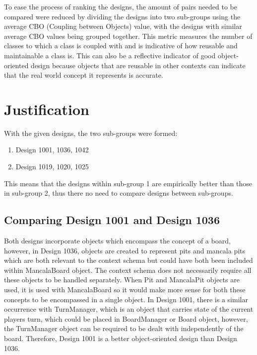 \documentclass[conference]{IEEEtran}
\begin{document}
To ease the process of ranking the designs, the amount of pairs needed to be compared were reduced by dividing the designs into two sub-groups using the average CBO (Coupling between Objects) value, with the designs with similar average CBO values being grouped together. This metric measures the number of classes to which a class is coupled with and is indicative of how reusable and maintainable a class is. This can also be a reflective indicator of good object-oriented design because objects that are reusable in other contexts can indicate that the real world concept it represents is accurate. 

\section{Justification}
With the given designs, the two sub-groups were formed:
\begin{enumerate}
	\item Design 1001, 1036, 1042
	\item Design 1019, 1020, 1025
\end{enumerate}
This means that the designs within sub-group 1 are empirically better than those in sub-group 2, thus there no need to compare designs between sub-groups.

\subsection{Comparing Design 1001 and Design 1036}
Both designs incorporate objects which encompass the concept of a board, however, in Design 1036, objects are created to represent pits and mancala pits which are both relevant to the context schema but could have both been included within MancalaBoard object. The context schema does not necessarily require all these objects to be handled separately. When Pit and MancalaPit objects are used, it is used with MancalaBoard so it would make more sense for both these concepts to be encompassed in a single object. In Design 1001, there is a similar occurrence with TurnManager, which is an object that carries state of the current players turn, which could be placed in BoardManager or Board object, however, the TurnManager object can be required to be dealt with independently of the board. Therefore, Design 1001 is a better object-oriented design than Design 1036.
\end{document}
